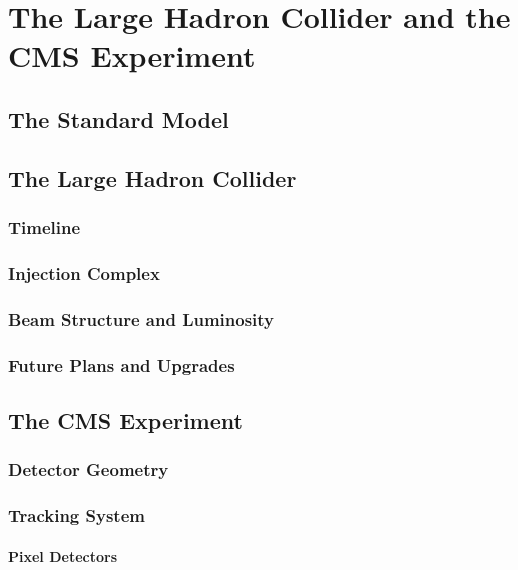 \chapter{The Large Hadron Collider and the CMS Experiment}
\label{chap:lhc_cms}

  \section{The Standard Model}

  \section{The Large Hadron Collider}

      \subsection{Timeline}

      \subsection{Injection Complex}

      \subsection{Beam Structure and Luminosity}

      \subsection{Future Plans and Upgrades}

  \section{The CMS Experiment}

      \subsection{Detector Geometry}

      \subsection{Tracking System}

          \subsubsection{Pixel Detectors}

